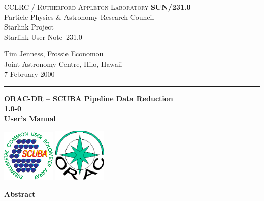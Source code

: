 \documentclass[twoside,11pt]{article}
\newcommand{\stardoccategory}  {Starlink User Note}
\newcommand{\stardocinitials}  {SUN}
\newcommand{\stardocnumber}    {231.0}
\newcommand{\stardocauthors}   {Tim Jenness, Frossie Economou\\
Joint Astronomy Centre, Hilo, Hawaii}
\newcommand{\stardocdate}      {7 February 2000}
\newcommand{\stardoctitle}     {ORAC-DR -- SCUBA Pipeline Data Reduction}
\newcommand{\stardocversion}   {1.0-0}
\newcommand{\stardocmanual}    {User's Manual}
\newcommand{\stardocname}{\stardocinitials /\stardocnumber}
\newenvironment{latexonly}{}{}
\renewcommand{\_}{\texttt{\symbol{95}}}
\begin{document}
\thispagestyle{empty}

\begin{latexonly}
   CCLRC / \textsc{Rutherford Appleton Laboratory} \hfill \textbf{\stardocname}\\
   {\large Particle Physics \& Astronomy Research Council}\\
   {\large Starlink Project\\}
   {\large \stardoccategory\ \stardocnumber}
   \begin{flushright}
   \stardocauthors\\
   \stardocdate
   \end{flushright}
   \vspace{-4mm}
   \rule{\textwidth}{0.5mm}
   \vspace{5mm}
   \begin{center}
   {\Huge\textbf{\stardoctitle \\ [2.5ex]}}
   {\LARGE\textbf{\stardocversion \\ [4ex]}}
   {\Huge\textbf{\stardocmanual}}
   \end{center}
   \vspace{5mm}

\begin{center}
\includegraphics[width=1.0in]{sun231_sculogo.eps}
\hskip 1.0in
\includegraphics[width=1.0in]{sun231_logo.eps}
\end{center}

   \vspace{10mm}
   \begin{center}
      {\Large\textbf{Abstract}}
   \end{center}
\end{latexonly}
\end{document}
